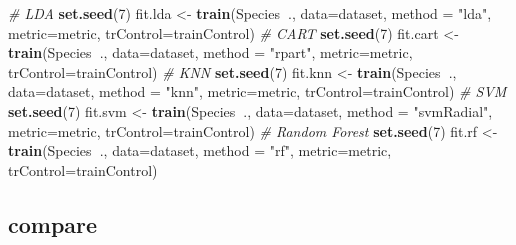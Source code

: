\documentclass[]{book}
\newenvironment{Shaded}{\begin{snugshade}}{\end{snugshade}}
\newcommand{\CommentTok}[1]{\textcolor[rgb]{0.56,0.35,0.01}{\textit{#1}}}
\newcommand{\DataTypeTok}[1]{\textcolor[rgb]{0.13,0.29,0.53}{#1}}
\newcommand{\DecValTok}[1]{\textcolor[rgb]{0.00,0.00,0.81}{#1}}
\newcommand{\KeywordTok}[1]{\textcolor[rgb]{0.13,0.29,0.53}{\textbf{#1}}}
\newcommand{\NormalTok}[1]{#1}
\newcommand{\OperatorTok}[1]{\textcolor[rgb]{0.81,0.36,0.00}{\textbf{#1}}}
\newcommand{\StringTok}[1]{\textcolor[rgb]{0.31,0.60,0.02}{#1}}
\begin{document}
\begin{Shaded}
\begin{Highlighting}[]
\CommentTok{# LDA}
\KeywordTok{set.seed}\NormalTok{(}\DecValTok{7}\NormalTok{)}
\NormalTok{fit.lda <-}\StringTok{ }\KeywordTok{train}\NormalTok{(Species}\OperatorTok{~}\NormalTok{., }\DataTypeTok{data=}\NormalTok{dataset, }\DataTypeTok{method =} \StringTok{"lda"}\NormalTok{, }
                 \DataTypeTok{metric=}\NormalTok{metric, }\DataTypeTok{trControl=}\NormalTok{trainControl)}
\CommentTok{# CART}
\KeywordTok{set.seed}\NormalTok{(}\DecValTok{7}\NormalTok{)}
\NormalTok{fit.cart <-}\StringTok{ }\KeywordTok{train}\NormalTok{(Species}\OperatorTok{~}\NormalTok{., }\DataTypeTok{data=}\NormalTok{dataset, }\DataTypeTok{method =} \StringTok{"rpart"}\NormalTok{, }
                  \DataTypeTok{metric=}\NormalTok{metric, }\DataTypeTok{trControl=}\NormalTok{trainControl)}
\CommentTok{# KNN}
\KeywordTok{set.seed}\NormalTok{(}\DecValTok{7}\NormalTok{)}
\NormalTok{fit.knn <-}\StringTok{ }\KeywordTok{train}\NormalTok{(Species}\OperatorTok{~}\NormalTok{., }\DataTypeTok{data=}\NormalTok{dataset, }\DataTypeTok{method =} \StringTok{"knn"}\NormalTok{, }
                 \DataTypeTok{metric=}\NormalTok{metric, }\DataTypeTok{trControl=}\NormalTok{trainControl)}
\CommentTok{# SVM}
\KeywordTok{set.seed}\NormalTok{(}\DecValTok{7}\NormalTok{)}
\NormalTok{fit.svm <-}\StringTok{ }\KeywordTok{train}\NormalTok{(Species}\OperatorTok{~}\NormalTok{., }\DataTypeTok{data=}\NormalTok{dataset, }\DataTypeTok{method =} \StringTok{"svmRadial"}\NormalTok{, }
                 \DataTypeTok{metric=}\NormalTok{metric, }\DataTypeTok{trControl=}\NormalTok{trainControl)}
\CommentTok{# Random Forest}
\KeywordTok{set.seed}\NormalTok{(}\DecValTok{7}\NormalTok{)}
\NormalTok{fit.rf <-}\StringTok{ }\KeywordTok{train}\NormalTok{(Species}\OperatorTok{~}\NormalTok{., }\DataTypeTok{data=}\NormalTok{dataset, }\DataTypeTok{method =} \StringTok{"rf"}\NormalTok{, }
                \DataTypeTok{metric=}\NormalTok{metric, }\DataTypeTok{trControl=}\NormalTok{trainControl)}
\end{Highlighting}
\end{Shaded}

\hypertarget{compare}{%
\subsection{compare}\label{compare}}
\end{document}
